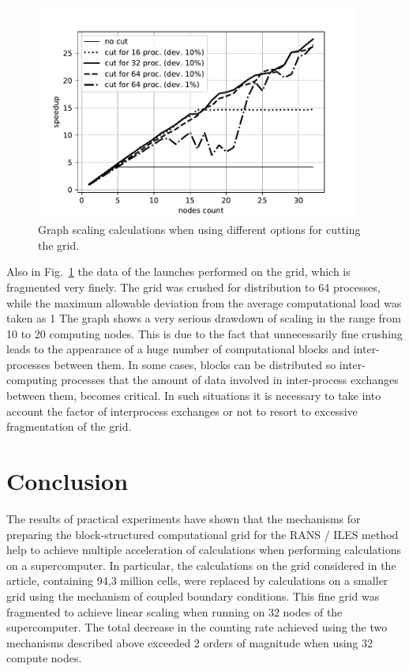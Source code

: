 \documentclass[
11pt,%
tightenlines,%
twoside,%
onecolumn,%
nofloats,%
nobibnotes,%
nofootinbib,%
superscriptaddress,%
noshowpacs,%
centertags]%
{revtex4}
\begin{document}
\begin{figure}[h]
\setcaptionmargin{5mm}
\onelinecaptionstrue
\includegraphics[width=0.95\textwidth]{pics/plot_36_scaling_2.pdf}
\caption{Graph scaling calculations when using different options for cutting the grid.}
\label{fig:plot_36_scaling_2}
\end{figure}

Also in Fig.~\ref{fig:plot_36_scaling_2} the data of the launches performed on the grid, which is fragmented very finely.
The grid was crushed for distribution to 64 processes, while the maximum allowable deviation from the average computational load was taken as 1%
The graph shows a very serious drawdown of scaling in the range from 10 to 20 computing nodes.
This is due to the fact that unnecessarily fine crushing leads to the appearance of a huge number of computational blocks and inter-processes between them.
In some cases, blocks can be distributed so inter-computing processes that the amount of data involved in inter-process exchanges between them, becomes critical.
In such situations it is necessary to take into account the factor of interprocess exchanges or not to resort to excessive fragmentation of the grid.

\section{Conclusion}

The results of practical experiments have shown that the mechanisms for preparing the block-structured computational grid for the RANS / ILES method help to achieve multiple acceleration of calculations when performing calculations on a supercomputer.
In particular, the calculations on the grid considered in the article, containing 94,3 million cells, were replaced by calculations on a smaller grid using the mechanism of coupled boundary conditions.
This fine grid was fragmented to achieve linear scaling when running on 32 nodes of the supercomputer.
The total decrease in the counting rate achieved using the two mechanisms described above exceeded 2 orders of magnitude when using 32 compute nodes.
\end{document}
